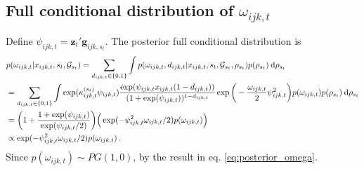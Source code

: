 \documentclass[12pt,a4paper]{article}
\theoremstyle{custom}
\begin{document}
\subsection{Full conditional distribution of $\omega_{ijk,t}$} \label{sec:posterior_omega_ijkt}
Define $\psi_{ijk,t} = \mathbf{z}_t' \mathbf{g}_{ijk,s_t}$. The posterior full conditional distribution is
\begin{align*}
& p(\omega_{ijk,t}|x_{ijk,t},s_t,\mathcal{G}_{s_t}) = \sum_{d_{ijk,t} \in \lbrace 0,1 \rbrace} \int p(\omega_{ijk,t},d_{ijk,t}|x_{ijk,t},s_t,\mathcal{G}_{s_t},\rho_{s_t}) p(\rho_{s_t}) \: \mathrm{d}\rho_{s_t} \\
 & = \sum_{d_{ijk,t} \in \lbrace 0,1 \rbrace} \int \exp( \kappa_{ijk,t}^{(s_t)} \psi_{ijk,t} ) \frac{\exp( \psi_{ijk,t} x_{ijk,t}(1-d_{ijk,t}) )}{(1+\exp( \psi_{ijk,t} ))^{1-d_{ijk,t}}} \exp\bigg( -\frac{\omega_{ijk,t}}{2}\psi_{ijk,t}^2 \bigg) p(\omega_{ijk,t}) p(\rho_{s_t}) \: \mathrm{d}\rho_{s_t} \\ \notag
 & = \bigg( 1+ \frac{1+\exp( \psi_{ijk,t} )}{\exp( \psi_{ijk,t}/2 )} \bigg) \Big( \exp( -\psi_{ijk,t}^2\omega_{ijk,t}/2) p(\omega_{ijk,t}) \Big) \\
 & \propto \exp( -\psi_{ijk,t}^2\omega_{ijk,t}/2) p(\omega_{ijk,t}) \, .
\end{align*}
Since $p(\omega_{ijk,t}) \sim PG(1,0)$, by \cite[Theorem 1]{Polsonetal13PolyaGamma} the result in eq. \eqref{eq:posterior_omega}.
\end{document}
